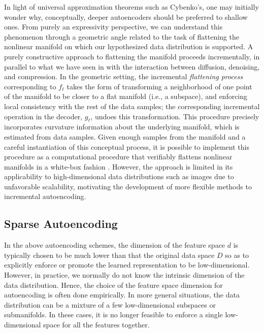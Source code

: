 \documentclass[\toplevelprefix/book-main.tex]{subfiles}
\begin{document}
In light of universal approximation theorems such as Cybenko's, one
may initially wonder why, conceptually, deeper autoencoders should be preferred
to shallow ones.
From purely an expressivity perspective, we can understand this phenomenon
through a geometric angle related to the task of flattening the nonlinear
manifold on which our hypothesized data distribution is supported. A purely
constructive approach to flattening the manifold proceeds incrementally, in
parallel to what we have seen in  with
the interaction between diffusion, denoising, and compression. In the geometric
setting, the incremental \textit{flattening process} corresponding to $f_{\ell}$
takes the form of transforming a neighborhood of one point of the manifold to be
closer to a flat manifold (i.e., a subspace), and enforcing local consistency
with the rest of the data samples; the corresponding incremental operation in
the decoder, $g_{\ell}$, undoes this transformation. This procedure precisely
incorporates curvature information about the underlying manifold, which is
estimated from data samples. Given enough samples from the manifold and
a careful instantiation of this conceptual process, it is possible to implement
this procedure as a computational procedure that verifiably flattens nonlinear
manifolds in a white-box fashion \cite{Psenka-JMLR24}. However, the approach is
limited in its applicability to high-dimensional data distributions such as
images due to unfavorable scalability, motivating the development of more
flexible methods to incremental autoencoding.

\subsection{Sparse Autoencoding}
In the above autoencoding schemes, the dimension of the feature space
$d$ is typically chosen to be much lower than that the original data
space $D$ so as to explicitly enforce or promote the learned
representation to be low-dimensional. However, in practice, we
normally do not know the intrinsic dimension of the data
distribution. Hence, the choice of the feature space dimension for
autoencoding is often done empirically. In more general situations,
the data distribution can be a mixture of a few low-dimensional
subspaces or submanifolds. In these cases, it is no longer feasible
to enforce a single low-dimensional space for all the features together.
\end{document}
